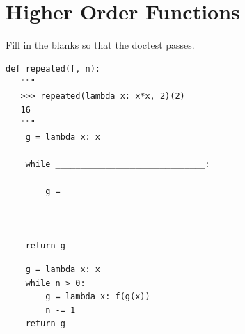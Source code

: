 \documentclass{exam}
\begin{document}
\section{Higher Order Functions}
\begin{questions}
\item Fill in the blanks so that the doctest passes.

\begin{lstlisting}
def repeated(f, n):
   """
   >>> repeated(lambda x: x*x, 2)(2)
   16
   """
    g = lambda x: x
    
    while ______________________________:
        
        g = ______________________________
        
        ______________________________
    
    return g
\end{lstlisting}

\begin{solution}
\begin{lstlisting}
    g = lambda x: x
    while n > 0:
        g = lambda x: f(g(x))
        n -= 1
    return g
\end{lstlisting}
\end{solution}
\end{questions}
\end{document}
